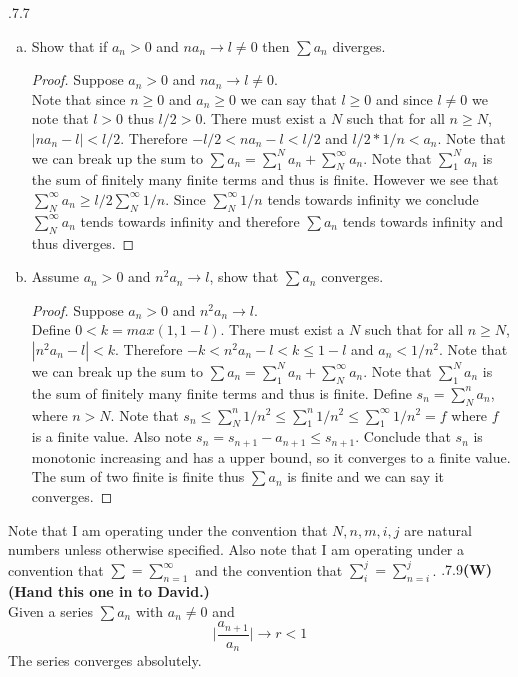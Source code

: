 \documentclass[12pt]{article}
\makeatletter
\theoremstyle{homework}
\newenvironment{exercise}[1]
{\def\@currentlabel{#1}\exercisecore}
{\endexercisecore}
\newcommand\W{{\color{red}\textbf{(W) (Hand this one in to David.)}}}
\makeatother
\begin{document}
\begin{exercise}

2.7.7\\
\end{exercise}
\begin{enumerate}[(a)]
\item
Show that if $a_n>0$ and $na_n\rightarrow l\neq 0$ then $\sum a_n$ diverges.
\begin{proof}
Suppose $a_n>0$ and $na_n\rightarrow l\neq 0$.\\
Note that since $n\geq 0$ and $a_n\geq 0$ we can say that $l\geq 0$ and since $l\neq 0$ we note that $l>0$ thus $l/2>0$.  There must exist a $N$ such that for all $n\geq N$, $|na_n-l|<l/2$.  Therefore $-l/2<na_n-l<l/2$ and $l/2*1/n<a_n$.  Note that we can break up the sum to $\sum a_n=\sum^N_1a_n+\sum_N^\infty a_n$.  Note that $\sum^N_1a_n$ is the sum of finitely many finite terms and thus is finite.  However we see that $\sum_N^\infty a_n\geq l/2\sum_N^\infty 1/n$.  Since $\sum_N^\infty 1/n$ tends towards infinity we conclude $\sum_N^\infty a_n$ tends towards infinity and therefore $\sum a_n$ tends towards infinity and thus diverges.
\end{proof}
\item
Assume $a_n>0$ and $n^2a_n\rightarrow l$, show that $\sum a_n$ converges.
\begin{proof}
Suppose $a_n>0$ and $n^2a_n\rightarrow l$.\\
Define $0<k=max(1,1-l)$.  There must exist a $N$ such that for all $n\geq N$, $|n^2a_n-l|<k$.  Therefore $-k<n^2a_n-l<k\leq 1-l$ and $a_n<1/n^2$.  Note that we can break up the sum to $\sum a_n=\sum^N_1a_n+\sum_N^\infty a_n$.  Note that $\sum^N_1a_n$ is the sum of finitely many finite terms and thus is finite.  Define $s_n=\sum_N^n a_n$, where $n>N$.  Note that $s_n\leq\sum_N^n 1/n^2\leq\sum_1^n1/n^2\leq \sum_1^\infty 1/n^2=f$ where $f$ is a finite value.  Also note $s_n= s_{n+1}-a_{n+1}\leq s_{n+1}$.  Conclude that $s_n$ is monotonic increasing and has a upper bound, so it converges to a finite value.  The sum of two finite is finite thus $\sum a_n$ is finite and we can say it converges.
\end{proof}
\end{enumerate}
\newpage
Note that I am operating under the convention that $N,n,m,i,j$ are natural numbers unless otherwise specified.  Also note that I am operating under a convention that $\sum=\sum_{n=1}^\infty$ and the convention that $\sum_i^j=\sum_{n=i}^j$.
\begin{exercise}

2.7.9\W\\
Given a series $\sum a_n$ with $a_n\neq 0$ and $$\biggr|\frac{a_{n+1}}{a_n}\biggr|\rightarrow r<1$$
The series converges absolutely.
\end{exercise}
\end{document}
